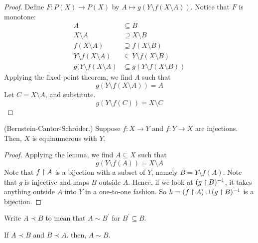 \documentclass[11pt]{article}
\begin{document}
\begin{proof}
    Define $F : P(X) \to P(X)$ by $A \mapsto g(Y \setminus f(X \setminus A))$.
    Notice that $F$ is monotone:
    \begin{align*}
        A &\subseteq B \\
        X \setminus A &\supseteq X \setminus B \\
        f(X \setminus A) &\supseteq f(X \setminus B) \\
        Y \setminus f(X \setminus A) &\subseteq Y \setminus f(X \setminus B) \\
        g(Y\setminus f(X\setminus A) &\subseteq g(Y\setminus f(X\setminus B))
    \end{align*}
    Applying the fixed-point theorem, we find $A$ such that
    \begin{equation*}
        g(Y \setminus f(X \setminus A)) = A
    \end{equation*}
    Let $C = X \setminus A$, and substitute.
    \begin{equation}
        \label{eq:prop-2}
        g(Y \setminus f(C)) = X \setminus C
    \end{equation}
\end{proof}

\begin{cor}{(Bernstein-Cantor-Schr\"oder.)}
    Suppose $f : X \to Y$ and $f : Y \to X$ are injections.
    Then, $X$ is equinumerous with $Y$.
\end{cor}

\begin{proof}
    Applying the lemma, we find $A \subseteq X$ such that
    \begin{equation*}
        g(Y \setminus f(A)) = X \setminus A
    \end{equation*}
    Note that $f \upharpoonright A$ is a bijection with a subset of $Y$,
    namely $B = Y \setminus f(A)$.
    Note that $g$ is injective and maps $B$ outside $A$.
    Hence, if we look at $(g \upharpoonright B)^{-1}$, it takes anything outside $A$
    into $Y$ in a one-to-one fashion.
    So $h = (f \upharpoonright A) \cup (g \upharpoonright B)^{-1}$ is a bijection.
\end{proof}

\newcommand{\equisub}{\prec}

Write $A \equisub B$ to mean that $A \sim B^\prime$ for $B^\prime \subseteq B$.

\begin{prop}
    If $A \equisub B$ and $B \equisub A$.
    then, $A \sim B$.
\end{prop}
\end{document}
